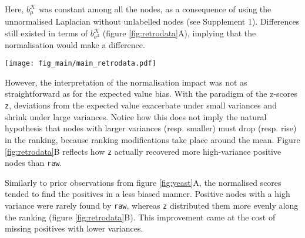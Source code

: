 \documentclass[final]{bioinfo}
\newcommand{\method}{\texttt}
\newcommand{\ebias}{b_{\mu}^{\mathcal{K}}}
\newcommand{\vbias}{b_{\sigma^2}^{\mathcal{K}}}
\begin{document}
Here, $\ebias$ was constant among all the nodes, as a consequence of using the unnormalised Laplacian without unlabelled nodes (see Supplement 1). 
Differences still existed in terms of $\vbias$ (figure \ref{fig:retrodata}A), implying that the normalisation would make a difference. 

\begin{figure*}[!tpb]%
\centerline{
\texttt{[image: fig\_main/main\_retrodata.pdf]}
}
\caption{Analysis of the prospective dataset.
\textbf{(A)} Pathway-wise comparison of new genes against the remaining genes outside the pathway, in terms of $\vbias$. 
Several pathways showed significant differences in both directions (two-sided Wilcoxon test). 
The $x$ axis was jittered for clarity.
\textbf{(B)} Ranking of the positives using \method{raw} and \method{z}. 
Each data point is the relative ranking of a positive gene in one of the pathways, i.e. before computing pathway-level metrics. 
Lines correspond to a quasi-logistic fit with a 0.95 confidence interval.
\method{raw} scores were more sensitive at low standard deviations, whereas \method{z} stood more uniform.
\textbf{(C)} Coefficients of the model $\mathrm{AUROC} \sim \mathrm{method} + \mathrm{method:path\_var\_ref}$ with a 0.95 confidence interval, where the interaction term involved the variance bias. 
The main effect of \method{raw} was not depicted because it was the reference level of \texttt{method}. 
\textbf{(D)} Predicted AUROC across all the pathways, as a function of the bias. 
\method{z} was less sensitive to the bias, due to its interaction term in \textbf{(C)} being closer to 0.
Lines correspond to a quasi-logistic fit with a 0.95 confidence interval.
}\label{fig:retrodata}
\end{figure*}

However, the interpretation of the normalisation impact was not as straightforward as for the expected value bias. 
With the paradigm of the z-scores \method{z}, deviations from the expected value exacerbate under small variances and shrink under large variances. 
Notice how this does not imply the natural hypothesis that nodes with larger variances (resp. smaller) must drop (resp. rise) in the ranking, because ranking modifications take place around the mean. 
Figure \ref{fig:retrodata}B reflects how \method{z} actually recovered more high-variance positive nodes than \method{raw}.

Similarly to prior observations from figure \ref{fig:yeast}A, the normalised scores tended to find the positives in a less biased manner. 
Positive nodes with a high variance were rarely found by \method{raw}, whereas \method{z} distributed them more evenly along the ranking (figure \ref{fig:retrodata}B).
This improvement came at the cost of missing positives with lower variances. 
\end{document}
